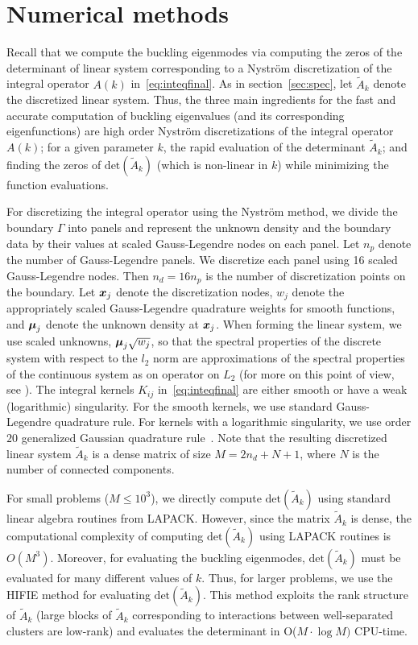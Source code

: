 
\section{Numerical methods}
Recall that we compute the buckling eigenmodes via computing the zeros
of the determinant of linear system corresponding to a Nystr\"{o}m 
discretization of the integral operator $A(k)$ in~\cref{eq:inteqfinal}.
As in section~\cref{sec:spec}, let $\tilde{A}_{k}$ denote the discretized
linear system.
Thus, the three main ingredients for the fast and accurate computation
of buckling eigenvalues (and its corresponding eigenfunctions) are
high order Nystr\"{o}m discretizations of the integral operator 
$A(k)$; for a given parameter $k$, the rapid evaluation of the determinant 
$\tilde{A}_{k}$; and finding the zeros of $\text{det}(\tilde{A}_{k})$ (which
is non-linear in $k$) while minimizing the function evaluations.

For discretizing the integral operator using the
Nystr\"{o}m method, we divide the boundary $\Gamma$ into
panels and represent the unknown density and the
boundary data by their values at scaled Gauss-Legendre
nodes on each panel. 
Let $n_{p}$ denote the number of Gauss-Legendre panels.
We discretize each panel using 16 scaled Gauss-Legendre nodes.
Then $n_{d} = 16 n_{p}$ is the number of discretization points 
on the boundary.
Let ${\boldsymbol x}_{j}$ denote the discretization nodes, $w_{j}$ denote the
appropriately scaled Gauss-Legendre quadrature weights for smooth functions,
and ${\boldsymbol \mu}_{j}$ denote the unknown density at ${\boldsymbol x}_{j}$.
When forming the linear system, we use scaled unknowns, 
${\boldsymbol \mu}_{j} \sqrt{w_{j}}$, so that the spectral properties of the 
discrete system with respect to the $l_2$ norm
are approximations of the spectral properties of the continuous
system as on operator on $L_2$ (for more on this point of view, 
see \cite{bremer2012}).
The integral kernels $K_{ij}$ in~\cref{eq:inteqfinal} 
are either smooth or have a weak (logarithmic) singularity. 
For the smooth kernels, we use standard 
Gauss-Legendre quadrature rule.
For kernels with a logarithmic singularity, we use order $20$ 
generalized Gaussian quadrature rule~\cite{bremer2010,bremer2010u}.
Note that the resulting discretized linear system $\tilde{A}_{k}$ 
is a dense matrix of size $M=2n_{d}+N+1$, 
where $N$ is the number of connected components.

For small problems ($M \leq 10^3$), we directly compute
$\text{det}(\tilde{A}_{k})$ using standard linear algebra routines
from LAPACK. 
However, since the matrix $\tilde{A}_{k}$ is dense,
the computational complexity of computing $\text{det}(\tilde{A}_{k})$ 
using LAPACK routines is $O(M^3)$.
Moreover, for evaluating the buckling eigenmodes, $\text{det}(\tilde{A}_{k})$
must be evaluated for many different values of $k$.
Thus, for larger problems, we use the HIFIE method for evaluating
$\text{det}(\tilde{A}_{k})$. 
This method exploits the rank structure of $\tilde{A}_{k}$ (large blocks
of $\tilde{A}_{k}$ corresponding to interactions between well-separated
clusters are low-rank) and evaluates the determinant in O($M \cdot \log{M})$ 
CPU-time.


